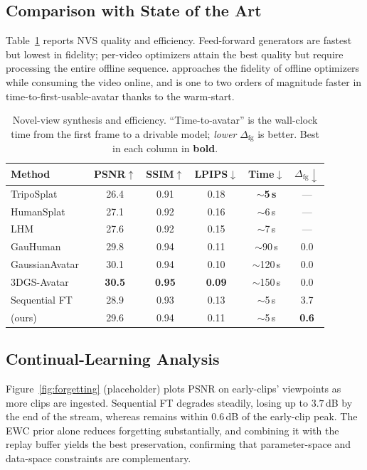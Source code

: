 \subsection{Comparison with State of the Art}\label{sec:exp:sota}
Table~\ref{tab:sota} reports NVS quality and efficiency.
Feed-forward generators are fastest but lowest in fidelity; per-video
optimizers attain the best quality but require processing the entire
offline sequence. \method{} approaches the fidelity of offline optimizers
while consuming the video online, and is one to two orders of magnitude
faster in time-to-first-usable-avatar thanks to the warm-start.

\begin{table}[t]
\centering
\caption{Novel-view synthesis and efficiency. ``Time-to-avatar'' is the
wall-clock time from the first frame to a drivable model; \textit{lower}
$\Delta_{\mathrm{fg}}$ is better. Best in each column in \textbf{bold}.}
\label{tab:sota}
\setlength{\tabcolsep}{4pt}
\begin{tabular}{lccccc}
\toprule
Method & PSNR$\uparrow$ & SSIM$\uparrow$ & LPIPS$\downarrow$ & Time$\downarrow$ & $\Delta_{\mathrm{fg}}\downarrow$ \\
\midrule
TripoSplat~\cite{yan2026triposplat}      & 26.4 & 0.91 & 0.18 & \textbf{$\sim$5\,s} & --- \\
HumanSplat~\cite{pan2024humansplat}      & 27.1 & 0.92 & 0.16 & $\sim$6\,s & --- \\
LHM~\cite{qiu2025lhm}                    & 27.6 & 0.92 & 0.15 & $\sim$7\,s & --- \\
GauHuman~\cite{hu2024gauhuman}           & 29.8 & 0.94 & 0.11 & $\sim$90\,s & 0.0 \\
GaussianAvatar~\cite{hu2024gaussianavatar}& 30.1 & 0.94 & 0.10 & $\sim$120\,s & 0.0 \\
3DGS-Avatar~\cite{qian2024gsavatar}      & \textbf{30.5} & \textbf{0.95} & \textbf{0.09} & $\sim$150\,s & 0.0 \\
Sequential FT                            & 28.9 & 0.93 & 0.13 & $\sim$5\,s & 3.7 \\
\method{} (ours)                         & 29.6 & 0.94 & 0.11 & $\sim$5\,s & \textbf{0.6} \\
\bottomrule
\end{tabular}
\end{table}

\subsection{Continual-Learning Analysis}\label{sec:exp:forgetting}
Figure~\ref{fig:forgetting} (placeholder) plots PSNR on early-clips'
viewpoints as more clips are ingested. Sequential FT degrades steadily,
losing up to $3.7$\,dB by the end of the stream, whereas \method{} remains
within $0.6$\,dB of the early-clip peak. The EWC prior alone reduces
forgetting substantially, and combining it with the replay buffer yields
the best preservation, confirming that parameter-space and
data-space constraints are complementary.

